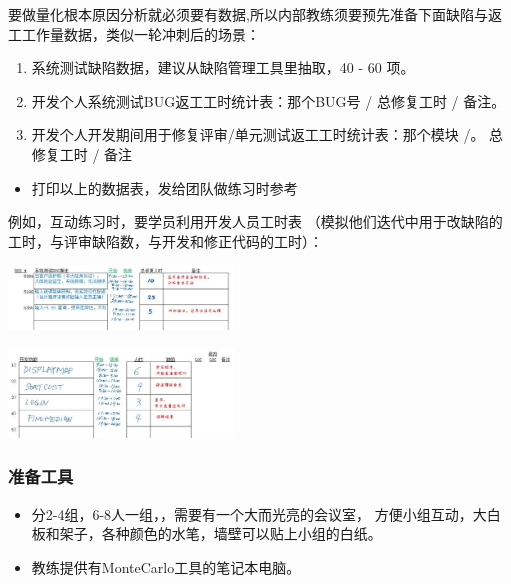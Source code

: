 要做量化根本原因分析就必须要有数据,所以内部教练须要预先准备下面缺陷与返工工作量数据，类似一轮冲刺后的场景：

\begin{enumerate}
\tightlist
\item
  系统测试缺陷数据，建议从缺陷管理工具里抽取，40 - 60 项。
\item
  开发个人系统测试BUG返工工时统计表：那个BUG号 / 总修复工时 / 备注。
\item
  开发个人开发期间用于修复评审/单元测试返工工时统计表：那个模块 /。
  总修复工时 / 备注
\end{enumerate}

\begin{itemize}
\tightlist
\item
  打印以上的数据表，发给团队做练习时参考
\end{itemize}

例如，互动练习时，要学员利用开发人员工时表
（模拟他们迭代中用于改缺陷的工时，与评审缺陷数，与开发和修正代码的工时）：


\includegraphics[width=6cm]{缺陷表41.jpg}


\includegraphics[width=6cm]{缺陷表51.jpg}

\hypertarget{ux51c6ux5907ux5de5ux5177}{%
\subsubsection{准备工具}\label{ux51c6ux5907ux5de5ux5177}}

\begin{itemize}
\tightlist
\item
  分2-4组，6-8人一组，，需要有一个大而光亮的会议室，
  方便小组互动，大白板和架子，各种颜色的水笔，墙壁可以贴上小组的白纸。
\item
  教练提供有MonteCarlo工具的笔记本电脑。
\end{itemize}

